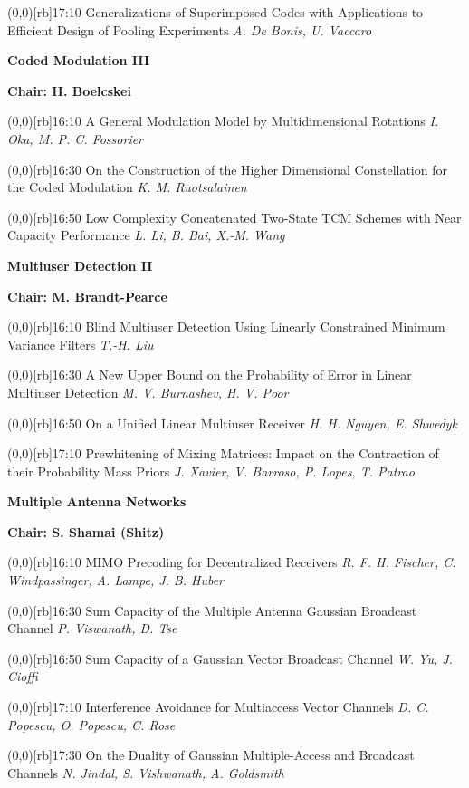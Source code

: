 \documentclass[a5paper,twoside]{article}
\def\sesstitle#1{\vspace{.45\bigskipamount}\par{\bfseries #1}\par}
\def\sesschair#1{{\bfseries Chair: #1}\par\vspace{.65\medskipamount}}
\def\papertime#1{\makebox(0,0)[rb]{{\scriptsize #1}\hspace{.5em}}}
\def\papertitle#1{#1\hfil\break}
\def\paperauthors#1{{\itshape #1}\par\filbreak\vspace{.65\medskipamount}}
\begin{document}
\papertime{17:10}%
\papertitle{Generalizations of Superimposed Codes with Applications to Efficient Design of Pooling Experiments}
\paperauthors{A. De Bonis, U. Vaccaro}
\sesstitle{Coded Modulation III}
\sesschair{H. Boelcskei}
\papertime{16:10}%
\papertitle{A General Modulation Model by Multidimensional Rotations}
\paperauthors{I. Oka, M. P. C. Fossorier}
\papertime{16:30}%
\papertitle{On the Construction of the Higher Dimensional Constellation for the Coded Modulation}
\paperauthors{K. M. Ruotsalainen}
\papertime{16:50}%
\papertitle{Low Complexity Concatenated Two-State TCM Schemes with Near Capacity Performance}
\paperauthors{L. Li, B. Bai, X.-M. Wang}
\sesstitle{Multiuser Detection II}
\sesschair{M. Brandt-Pearce}
\papertime{16:10}%
\papertitle{Blind Multiuser Detection Using Linearly Constrained Minimum Variance Filters}
\paperauthors{T.-H. Liu}
\papertime{16:30}%
\papertitle{A New Upper Bound on the Probability of Error in Linear Multiuser Detection}
\paperauthors{M. V. Burnashev, H. V. Poor}
\papertime{16:50}%
\papertitle{On a Unified Linear Multiuser Receiver}
\paperauthors{H. H. Nguyen, E. Shwedyk}
\papertime{17:10}%
\papertitle{Prewhitening of Mixing Matrices: Impact on the Contraction of their Probability Mass Priors}
\paperauthors{J. Xavier, V. Barroso, P. Lopes, T. Patrao}
\sesstitle{Multiple Antenna Networks}
\sesschair{S. Shamai (Shitz)}
\papertime{16:10}%
\papertitle{MIMO Precoding for Decentralized Receivers}
\paperauthors{R. F. H. Fischer, C. Windpassinger, A. Lampe, J. B. Huber}
\papertime{16:30}%
\papertitle{Sum Capacity of the Multiple Antenna Gaussian Broadcast Channel}
\paperauthors{P. Viswanath, D. Tse}
\papertime{16:50}%
\papertitle{Sum Capacity of a Gaussian Vector Broadcast Channel}
\paperauthors{W. Yu, J. Cioffi}
\papertime{17:10}%
\papertitle{Interference Avoidance for Multiaccess Vector Channels}
\paperauthors{D. C. Popescu, O. Popescu, C. Rose}
\papertime{17:30}%
\papertitle{On the Duality of Gaussian Multiple-Access and Broadcast Channels}
\paperauthors{N. Jindal, S. Vishwanath, A. Goldsmith}
\end{document}
